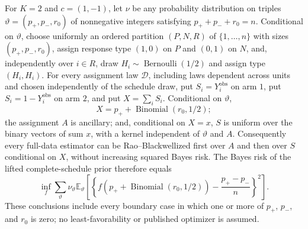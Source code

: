 For \(K=2\) and \(c=(1,-1)\), let \(\nu\) be any probability distribution on triples \(\vartheta=(p_+,p_-,r_0)\) of nonnegative integers satisfying \(p_++p_-+r_0=n\). Conditional on \(\vartheta\), choose uniformly an ordered partition \((P,N,R)\) of \(\{1,\ldots,n\}\) with sizes \((p_+,p_-,r_0)\), assign response type \((1,0)\) on \(P\) and \((0,1)\) on \(N\), and, independently over \(i\in R\), draw \(H_i\sim\operatorname{Bernoulli}(1/2)\) and assign type \((H_i,H_i)\). For every assignment law \(\mathcal D\), including laws dependent across units and chosen independently of the schedule draw, put \(S_i=Y_i^{\mathrm{obs}}\) on arm \(1\), put \(S_i=1-Y_i^{\mathrm{obs}}\) on arm \(2\), and put \(X=\sum_iS_i\). Conditional on \(\vartheta\),
\[
 X=p_++\operatorname{Binomial}(r_0,1/2);
\]
the assignment \(A\) is ancillary; and, conditional on \(X=x\), \(S\) is uniform over the binary vectors of sum \(x\), with a kernel independent of \(\vartheta\) and \(A\). Consequently every full-data estimator can be Rao--Blackwellized first over \(A\) and then over \(S\) conditional on \(X\), without increasing squared Bayes risk. The Bayes risk of the lifted complete-schedule prior therefore equals
\[
 \inf_f\sum_\vartheta\nu_\vartheta
 \mathbb E_\vartheta\!\left[
 \left\{f\!\left(p_++\operatorname{Binomial}(r_0,1/2)\right)
 -\frac{p_+-p_-}{n}\right\}^2\right].
\]
These conclusions include every boundary case in which one or more of \(p_+\), \(p_-\), and \(r_0\) is zero; no least-favorability or published optimizer is assumed.